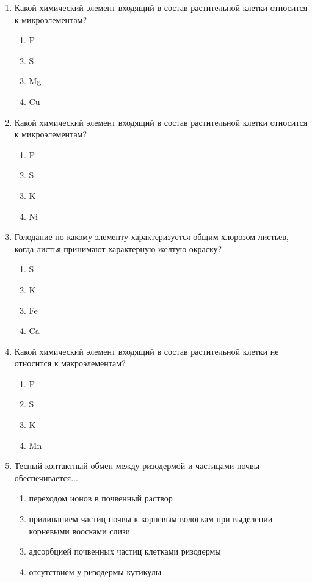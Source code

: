 \begin{enumerate}
\item Какой химический элемент входящий в состав растительной клетки относится к микроэлементам?
\begin{enumerate}
	\item P          
	\item S
	\item Mg       
	\item Cu
\end{enumerate}

\item Какой химический элемент входящий в состав растительной клетки относится к микроэлементам?
\begin{enumerate}
	\item P          
	\item S
	\item K          
	\item Ni
\end{enumerate}

\item Голодание по какому элементу характеризуется общим хлорозом листьев, когда листья принимают характерную желтую окраску?
\begin{enumerate}
	\item S          
	\item K
	\item Fe        
	\item Ca
\end{enumerate}

\item Какой химический элемент входящий в состав растительной клетки не относится к макроэлементам?
\begin{enumerate}
	\item P         
	\item S
	\item K        
	\item Mn
\end{enumerate}

\item Тесный контактный обмен между ризодермой и частицами почвы обеспечивается...
\begin{enumerate}
	\item переходом ионов в почвенный раствор
	\item прилипанием частиц почвы к корневым волоскам при выделении корневыми воосками слизи
	\item адсорбцией почвенных частиц клетками ризодермы
	\item отсутствием у ризодермы кутикулы
\end{enumerate}


\end{enumerate}
